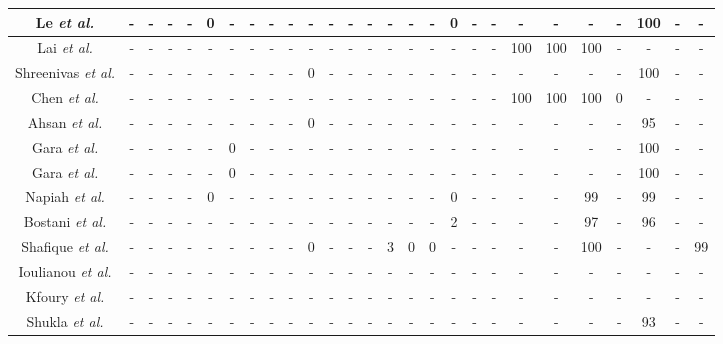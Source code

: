 \documentclass[10pt,journal,sort & compress]{IEEEtran}
\begin{document}
\begin{landscape}
\begin{longtable}{|c|c|c|c|c|c|c|c|c|c|c|c|c|c|c|c|c|c|c|c|c|c|c|c|c|c|c|}
		Le \textit{et al.}\cite{Le2016} & - & -  & - & - & 0 & - & - &  -& - &-  &-  & - &-  & - & - & - & 0 &-  &-  & -   &  -&-  &  -&100   &-  &-   \\ \hline
		Lai \textit{et al.}\cite{lai2016detection} & - &- &  -&  -&-  & - &-  & - & - & - &  -& - &-  & - &-  &-  &  -  &  -& - &  100 & 100 & 100 & - & -  & - & -  \\ \hline
		Shreenivas \textit{et al.}\cite{Shreenivas2017}  &  -&-  &  - &-  & - &  -& - &-  & - & 0 &-  &  -& - & - &  - &   -& - &-  & - & - &  -& - &-  &100   & - &   - \\ \hline
		Chen \textit{et al.}\cite{chen2016defense}  & - &  - & - & - & - & - & - & - & - & - & - & - & - & - &-  & - & -  & -  & - & 100 & 100 &  100&0  & -  & - &  - \\ \hline
		Ahsan \textit{et al.}\cite{ahsan2017wormhole}   & - &  -& -&  -&  -&  -& - &  -&-  & 0 &  -& - & - &  -&-  &-  &   - & - & -  & - & - & - & - & 95  &-  & -  \\ \hline
		Gara \textit{et al.}\cite{gara2017intrusion} & - & -  & - &-  & - & 0 & - & - & - & - & - & - & - & - & - &-  &  -  & - & - & - & - & - & - & 100  & - & -   \\ \hline
		Gara \textit{et al.}\cite{GaraInderscience} & - & -  & - &-  & - & 0 & - & - & - & - & - & - & - & - & - &-  &  -  & - & -& - & - & - & - & 100  & - & -   \\ \hline
		Napiah \textit{et al.}\cite{Napiah2018} & - &    -& - & - & 0 &  -& - &-  & - & - & - & - &  -&-  &-  &-  & 0 & -&- & - &-  & 99 & - & 99 & - & -  \\ \hline
		Bostani \textit{et al.}\cite{Bostani2017} &  -&  -  &  -& - & - & - &  -& - & - &-  & - & - & - & - & - & - & 2 &   - & - & - & - & 97 & - & 96  & - &  - \\ \hline
		Shafique \textit{et al.}\cite{shafique2018detection} &-  & -&  -&  -& - &  -&-  &-  &  -& 0 & - &  -& - & 3  & 0 & 0 & - & - &  - &-  & - & 100 & - & - &-  & 99  \\ \hline
		Ioulianou \textit{et al.}\cite{ioulianou2018signature} &  - & - & - & - & - & - & - & - & - & - & - & - & - & - & - & - & - & - & - & - & - & - &  - & - & - &  - \\ \hline
		Kfoury \textit{et al.}\cite{kfoury2019self} & - &  - & - & - & - & - & - & - & - & - & - & - & - & - & - & - & - & - & - & -  & - & - &  - & - & - &  - \\ \hline
		Shukla \textit{et al.}\cite{shukla2017ml} & - &  - & - & - & - & - & - &  -& - &  -&-  & - & - & - &  -& - & - &-  &  - &  -& - & - & - & 93  &  -&-   \\ \hline
		
	\end{longtable}
\end{landscape}
\end{document}
